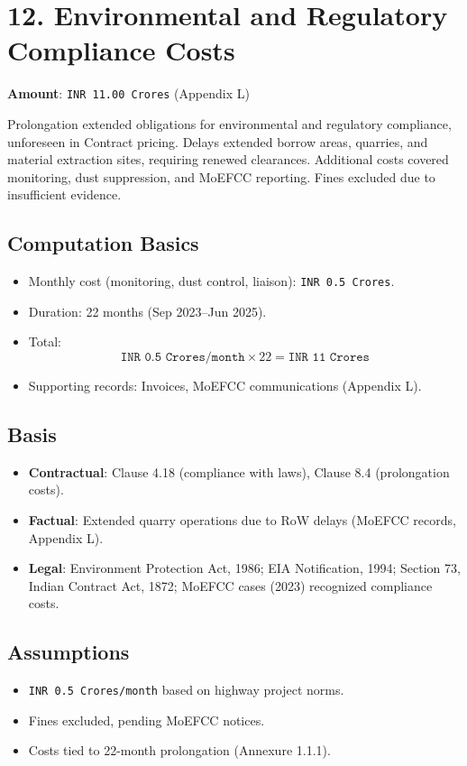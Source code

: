 \documentclass[12pt,letterpaper]{article}
\begin{document}
	\section*{12. Environmental and Regulatory Compliance Costs}
	\textbf{Amount}: \texttt{INR 11.00 Crores} (Appendix L)
	
	Prolongation extended obligations for environmental and regulatory compliance, unforeseen in Contract pricing. Delays extended borrow areas, quarries, and material extraction sites, requiring renewed clearances. Additional costs covered monitoring, dust suppression, and MoEFCC reporting. Fines excluded due to insufficient evidence.
	
	\subsection*{Computation Basics}
	\begin{itemize}
		\item Monthly cost (monitoring, dust control, liaison): \texttt{INR 0.5 Crores}.
		\item Duration: 22 months (Sep 2023--Jun 2025).
		\item Total:
		\[
		\texttt{INR 0.5 Crores/month} \times 22 = \texttt{INR 11 Crores}
		\]
		\item Supporting records: Invoices, MoEFCC communications (Appendix L).
	\end{itemize}
	
	\subsection*{Basis}
	\begin{itemize}
		\item \textbf{Contractual}: Clause 4.18 (compliance with laws), Clause 8.4 (prolongation costs).
		\item \textbf{Factual}: Extended quarry operations due to RoW delays (MoEFCC records, Appendix L).
		\item \textbf{Legal}: Environment Protection Act, 1986; EIA Notification, 1994; Section 73, Indian Contract Act, 1872; MoEFCC cases (2023) recognized compliance costs.
	\end{itemize}
	
	\subsection*{Assumptions}
	\begin{itemize}
		\item \texttt{INR 0.5 Crores/month} based on highway project norms.
		\item Fines excluded, pending MoEFCC notices.
		\item Costs tied to 22-month prolongation (Annexure 1.1.1).
	\end{itemize}
	
\end{document}
